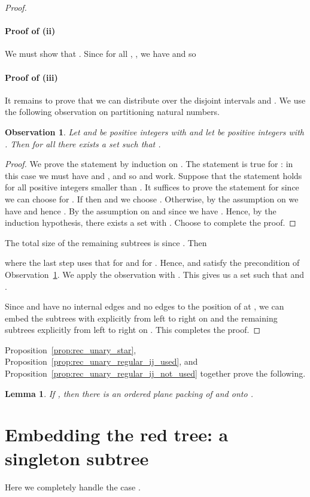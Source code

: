 \documentclass[11pt,a4paper,colorlinks=true,urlcolor=blue,citecolor=red]{article}
\theoremstyle{plain}
\newtheorem{lemma}[theorem]{Lemma}
\newtheorem{observation}[theorem]{Observation}
\newcommand{\subsubparagraph}[1]{\paragraph{#1}}
\begin{document}
\begin{proof}
  \subsubparagraph{Proof of (ii)} We must show that .
  Since  for all , ,
  we have  and so


  \subsubparagraph{Proof of (iii)} It remains to prove that we can
  distribute  over the disjoint
  intervals  and . We
  use the following observation on partitioning natural numbers.
\begin{observation}
    \label{obs:unary_2dc_partition}
    Let  and  be positive integers with  and let  be positive integers
    with . Then for all  there exists
    a set  such that .
  \end{observation}
  \begin{proof}
    We prove the statement by induction on . The statement is true
    for : in this case we must have  and , and so
     and  work. Suppose that the statement
    holds for all positive integers smaller than . It suffices to
    prove the statement for  since we can
    choose  for . If
     then  and we choose . Otherwise,
    by the assumption on  we have  and hence .
By the assumption on  and since  we have . Hence, by the
    induction hypothesis, there exists a set  with . Choose
     to complete the proof.
  \end{proof}
The total size of the remaining subtrees is
   since .
  Then

where the last step uses that  for  and  for .
Hence,  and  satisfy the precondition of
  Observation~\ref{obs:unary_2dc_partition}. We apply the observation
  with . This gives us a set  such that  and .

  Since  and  have no internal edges and no edges to the
  position of  at , we can embed the subtrees  with
   explicitly from left to right on  and the remaining
  subtrees explicitly from left to right on . This completes the
  proof.
\end{proof}

Proposition~\ref{prop:rec_unary_star},
Proposition~\ref{prop:rec_unary_regular_ij_used}, and
Proposition~\ref{prop:rec_unary_regular_ij_not_used} together prove the
following.

\begin{lemma}
  \label{lem:rec_unary}
  If , then there is an ordered plane packing of  and
   onto .
\end{lemma}

\section{Embedding the red tree: a singleton subtree}
\label{subsec:rec_singleton}
Here we completely handle the case .
\end{document}
